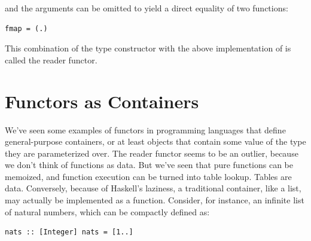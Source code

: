 and the arguments can be omitted to yield a direct equality of two
functions:

\begin{verbatim}
fmap = (.)
\end{verbatim}

This combination of the type constructor 
with the above implementation of  is called the reader
functor.

\section{Functors as Containers}\label{functors-as-containers}

We've seen some examples of functors in programming languages that
define general-purpose containers, or at least objects that contain some
value of the type they are parameterized over. The reader functor seems
to be an outlier, because we don't think of functions as data. But we've
seen that pure functions can be memoized, and function execution can be
turned into table lookup. Tables are data. Conversely, because of
Haskell's laziness, a traditional container, like a list, may actually
be implemented as a function. Consider, for instance, an infinite list
of natural numbers, which can be compactly defined as:

\begin{verbatim}
nats :: [Integer] nats = [1..]
\end{verbatim}

